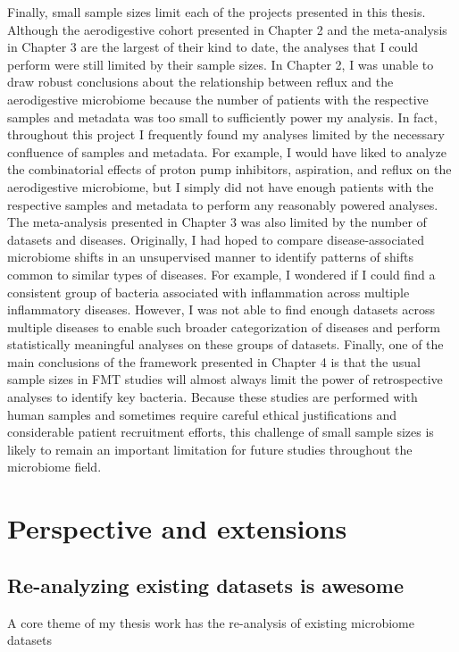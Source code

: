 Finally, small sample sizes limit each of the projects presented in this thesis.
Although the aerodigestive cohort presented in Chapter 2 and the meta-analysis in Chapter 3 are the largest of their kind to date, the analyses that I could perform were still limited by their sample sizes.
In Chapter 2, I was unable to draw robust conclusions about the relationship between reflux and the aerodigestive microbiome because the number of patients with the respective samples and metadata was too small to sufficiently power my analysis.
In fact, throughout this project I frequently found my analyses limited by the necessary confluence of samples and metadata.
For example, I would have liked to analyze the combinatorial effects of proton pump inhibitors, aspiration, and reflux on the aerodigestive microbiome, but I simply did not have enough patients with the respective samples and metadata to perform any reasonably powered analyses.
The meta-analysis presented in Chapter 3 was also limited by the number of datasets and diseases.
Originally, I had hoped to compare disease-associated microbiome shifts in an unsupervised manner to identify patterns of shifts common to similar types of diseases.
For example, I wondered if I could find a consistent group of bacteria associated with inflammation across multiple inflammatory diseases.
However, I was not able to find enough datasets across multiple diseases to enable such broader categorization of diseases and perform statistically meaningful analyses on these groups of datasets.
Finally, one of the main conclusions of the framework presented in Chapter 4 is that the usual sample sizes in FMT studies will almost always limit the power of retrospective analyses to identify key bacteria.
Because these studies are performed with human samples and sometimes require careful ethical justifications and considerable patient recruitment efforts, this challenge of small sample sizes is likely to remain an important limitation for future studies throughout the microbiome field.

\section{Perspective and extensions}

\subsection{Re-analyzing existing datasets is awesome}

A core theme of my thesis work has the re-analysis of existing microbiome datasets


